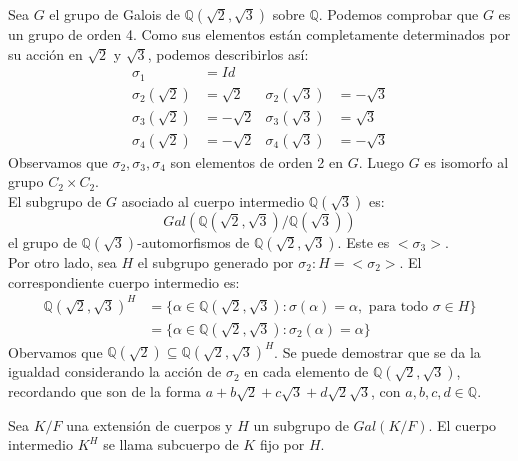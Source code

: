 \begin{example}
    Sea $G$ el grupo de Galois de $\mathbb{Q}(\sqrt{2}, \sqrt{3})$ sobre $\mathbb{Q}$.
    Podemos comprobar que $G$ es un grupo de orden 4.
    Como sus elementos están completamente determinados por su acción en $\sqrt{2}$ y $\sqrt{3}$, podemos describirlos así:
    \begin{align*}
        \sigma_1           & = Id                                           \\
        \sigma_2(\sqrt{2}) & = \sqrt{2}  & \sigma_2(\sqrt{3}) & = -\sqrt{3} \\
        \sigma_3(\sqrt{2}) & = -\sqrt{2} & \sigma_3(\sqrt{3}) & = \sqrt{3}  \\
        \sigma_4(\sqrt{2}) & = -\sqrt{2} & \sigma_4(\sqrt{3}) & = -\sqrt{3}
    \end{align*}
    Observamos que $\sigma_2, \sigma_3, \sigma_4$ son elementos de orden 2 en $G$.
    Luego $G$ es isomorfo al grupo $C_2 \times C_2$.\\
    El subgrupo de $G$ asociado al cuerpo intermedio $\mathbb{Q}(\sqrt{3})$ es:
    $$Gal(\mathbb{Q}(\sqrt{2}, \sqrt{3}) / \mathbb{Q}(\sqrt{3}))$$
    el grupo de $\mathbb{Q}(\sqrt{3})$-automorfismos de $\mathbb{Q}(\sqrt{2}, \sqrt{3})$. Este es $< \sigma_3 >$.\\
    Por otro lado, sea $H$ el subgrupo generado por $\sigma_2 : H = < \sigma_2 >$.
    El correspondiente cuerpo intermedio es:
    \begin{align*}
        \mathbb{Q}(\sqrt{2}, \sqrt{3})^H & = \{ \alpha \in \mathbb{Q}(\sqrt{2}, \sqrt{3}) : \sigma(\alpha) = \alpha, \text{ para todo } \sigma \in H \} \\
                                         & = \{ \alpha \in \mathbb{Q}(\sqrt{2}, \sqrt{3}) : \sigma_2(\alpha) = \alpha \}
    \end{align*}
    Obervamos que $\mathbb{Q}(\sqrt{2}) \subseteq \mathbb{Q}(\sqrt{2}, \sqrt{3})^H$.
    Se puede demostrar que se da la igualdad considerando la acción de $\sigma_2$ en cada elemento de $\mathbb{Q}(\sqrt{2}, \sqrt{3})$, recordando que son de la forma $a + b\sqrt{2} + c\sqrt{3} + d\sqrt{2}\sqrt{3}$, con $a, b, c, d \in \mathbb{Q}$.
\end{example}

\begin{definition}
    Sea $K/F$ una extensión de cuerpos y $H$ un subgrupo de $Gal(K/F)$.
    El cuerpo intermedio $K^H$ se llama subcuerpo de $K$ fijo por $H$.
\end{definition}

